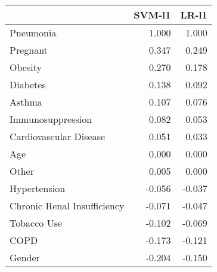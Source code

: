 \begin{tabular}{lrr}
\toprule
{} &  SVM-l1 &  LR-l1 \\
\midrule
Pneumonia                   &   1.000 &  1.000 \\
Pregnant                    &   0.347 &  0.249 \\
Obesity                     &   0.270 &  0.178 \\
Diabetes                    &   0.138 &  0.092 \\
Asthma                      &   0.107 &  0.076 \\
Immunosuppression           &   0.082 &  0.053 \\
Cardiovascular Disease      &   0.051 &  0.033 \\
Age                         &   0.000 &  0.000 \\
Other                       &   0.005 &  0.000 \\
Hypertension                &  -0.056 & -0.037 \\
Chronic Renal Insufficiency &  -0.071 & -0.047 \\
Tobacco Use                 &  -0.102 & -0.069 \\
COPD                        &  -0.173 & -0.121 \\
Gender                      &  -0.204 & -0.150 \\
\bottomrule
\end{tabular}
